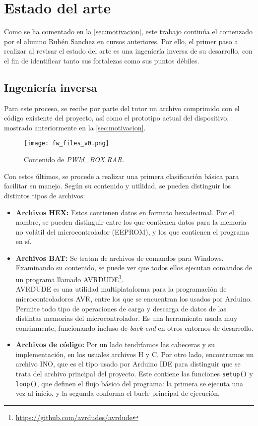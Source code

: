 \chapter{Estado del arte}
\label{ch:estado_del_arte}

Como se ha comentado en la \autoref{sec:motivacion}, este trabajo continúa el comenzado por el alumno Rubén Sanchez en cursos anteriores. Por ello, el primer paso a realizar al revisar el estado del arte es una ingeniería inversa de su desarrollo, con el fin de identificar tanto sus fortalezas como sus puntos débiles.
\section{Ingeniería inversa}
\label{sec:inginv}

Para este proceso, se recibe por parte del tutor un archivo comprimido con el código existente del proyecto, así como el prototipo actual del dispositivo, mostrado anteriormente en la \autoref{sec:motivacion}.

\begin{figure}[ht]
    \centering
    \texttt{[image: fw\_files\_v0.png]}
    \caption{Contenido de \textit{PWM\_BOX.RAR}.}
    \label{fig:fw_v0}
\end{figure}

Con estos últimos, se procede a realizar una primera clasificación básica para facilitar su manejo. Según su contenido y utilidad, se pueden distinguir los distintos tipos de archivos:

\begin{itemize}
    \item{\textbf{Archivos HEX:}} Estos contienen datos en formato hexadecimal. Por el nombre, se pueden distinguir entre los que contienen datos para la memoria no volátil del microcontrolador (EEPROM), y los que contienen el programa en sí.
    \item{\textbf{Archivos BAT:}} Se tratan de archivos de comandos para Windows. Examinando su contenido, se puede ver que todos ellos ejecutan comandos de un programa llamado AVRDUDE\footnote{\url{https://github.com/avrdudes/avrdude}}.\\
    AVRDUDE es una utilidad multiplataforma para la programación de microcontroladores AVR, entre los que se encuentran los usados por Arduino. Permite todo tipo de operaciones de carga y descarga de datos de las distintas memorias del microcontrolador. Es una herramienta usada muy comúnmente, funcionando incluso de \textit{back-end} en otros entornos de desarrollo.
    \item{\textbf{Archivos de código:}} Por un lado tendríamos las cabeceras y su implementación, en los usuales archivos H y C. Por otro lado, encontramos un archivo INO, que es el tipo usado por Arduino IDE para distinguir que se trata del archivo principal del proyecto. Este contiene las funciones \verb|setup()| y \verb|loop()|, que definen el flujo básico del programa: la primera se ejecuta una vez al inicio, y la segunda conforma el bucle principal de ejecución.
\end{itemize}

